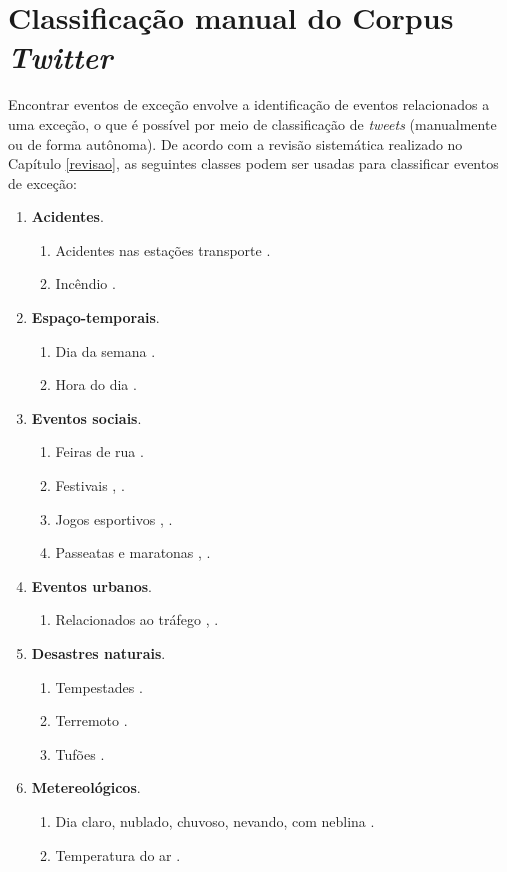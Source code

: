 \documentclass[
	12pt,				%
	oneside,			%
	a4paper,			%
	english,			%
	brazil				%
	]{abntex2ppgsi}
\begin{document}
\section{Classificação manual do Corpus \textit{Twitter}}
\label{manualClassification}

Encontrar eventos de exceção envolve a identificação de eventos relacionados a uma exceção, o que é possível por meio de classificação de \textit{tweets} (manualmente ou de forma autônoma). De acordo com a revisão sistemática realizado no Capítulo \ref{revisao}, as seguintes classes podem ser usadas para classificar eventos de exceção:

\begin{enumerate}
\item \textbf{Acidentes}.
\begin{enumerate}
\item Acidentes nas estações transporte \cite{Itoh2016}.
\item Incêndio \cite{Itoh2016}.
\end{enumerate}

\item \textbf{Espaço-temporais}.
\begin{enumerate}
\item Dia da semana \cite{Chen2016}.
\item Hora do dia \cite{Chen2016}.
\end{enumerate}

\item \textbf{Eventos sociais}.
\begin{enumerate}
\item Feiras de rua \cite{Chen2016}.
\item Festivais \cite{Chen2016}, \cite{Lecue2014}.
\item Jogos esportivos \cite{Chen2016}, \cite{Gal-Tzur2014}.
\item Passeatas e maratonas \cite{Chen2016}, \cite{Itoh2016}.
\end{enumerate}

\item \textbf{Eventos urbanos}.
\begin{enumerate}
\item Relacionados ao tráfego \cite{Chen2016}, \cite{Lecue2014}.
\end{enumerate}

\item \textbf{Desastres naturais}.
\begin{enumerate}
\item Tempestades \cite{Itoh2016}.
\item Terremoto \cite{Itoh2016}.
\item Tufões \cite{Itoh2016}.
\end{enumerate}

\item \textbf{Metereológicos}.
\begin{enumerate}
\item Dia claro, nublado, chuvoso, nevando, com neblina \cite{Chen2016}.
\item Temperatura do ar \cite{Chen2016}.
\end{enumerate}
\end{enumerate}
\end{document}
